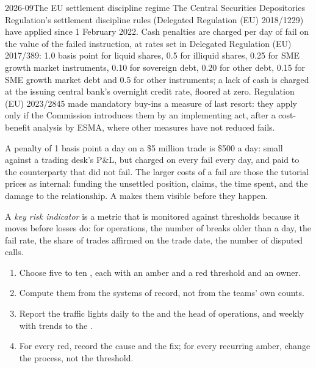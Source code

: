 \begin{dated}{2026-09}{The EU settlement discipline regime}\label{dat:fm:operations:csdr}
The Central Securities Depositories Regulation's settlement discipline rules (Delegated Regulation (EU) 2018/1229) have applied since 1 February
2022. Cash penalties are charged per day of fail on the value of the failed instruction, at rates set in Delegated Regulation (EU) 2017/389: 1.0
basis point for liquid shares, 0.5 for illiquid shares, 0.25 for SME growth market instruments, 0.10 for sovereign debt, 0.20 for other debt,
0.15 for SME growth market debt and 0.5 for other instruments; a lack of cash is charged at the issuing central bank's overnight credit rate,
floored at zero. Regulation (EU) 2023/2845 made mandatory buy-ins a measure of last resort: they apply only if the Commission introduces them by
an implementing act, after a cost-benefit analysis by ESMA, where other measures have not reduced fails.
\end{dated}

A penalty of 1 basis point a day on a \$5 million trade is \$500 a day: small against a trading desk's P\&L, but charged on every fail every day,
and paid to the counterparty that did not fail. The larger costs of a fail are those the tutorial prices as internal: funding the unsettled
position, claims, the time spent, and the damage to the relationship. A  makes them visible before they happen.

\begin{definition}\label{def:fm:operations:kri}
A \emph{key risk indicator} is a metric that is monitored against thresholds because it moves before losses do: for
operations, the number of breaks older than a day, the fail rate, the share of trades affirmed on the trade date, the number of disputed calls.
\end{definition}

\begin{method}\label{met:fm:operations:report}
\begin{enumerate}
\item Choose five to ten , each with an amber and a red threshold and an owner.
\item Compute them from the systems of record, not from the teams' own counts.
\item Report the traffic lights daily to the  and the head of operations, and weekly with trends to the .
\item For every red, record the cause and the fix; for every recurring amber, change the process, not the threshold.
\end{enumerate}
\end{method}

